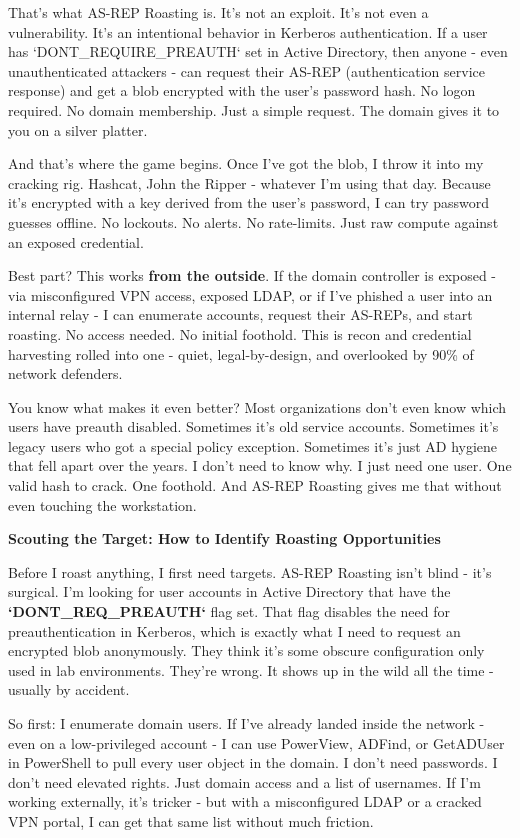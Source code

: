 That’s what AS-REP Roasting is. It’s not an exploit. It’s not even a vulnerability. It’s an intentional behavior in Kerberos authentication. If a user has `DONT\_REQUIRE\_PREAUTH` set in Active Directory, then anyone - even unauthenticated attackers - can request their AS-REP (authentication service response) and get a blob encrypted with the user’s password hash. No logon required. No domain membership. Just a simple request. The domain gives it to you on a silver platter.

And that’s where the game begins. Once I’ve got the blob, I throw it into my cracking rig. Hashcat, John the Ripper - whatever I’m using that day. Because it’s encrypted with a key derived from the user’s password, I can try password guesses offline. No lockouts. No alerts. No rate-limits. Just raw compute against an exposed credential. 

Best part? This works \textbf{from the outside}. If the domain controller is exposed - via misconfigured VPN access, exposed LDAP, or if I’ve phished a user into an internal relay - I can enumerate accounts, request their AS-REPs, and start roasting. No access needed. No initial foothold. This is recon and credential harvesting rolled into one - quiet, legal-by-design, and overlooked by 90\% of network defenders.

You know what makes it even better? Most organizations don’t even know which users have preauth disabled. Sometimes it’s old service accounts. Sometimes it’s legacy users who got a special policy exception. Sometimes it’s just AD hygiene that fell apart over the years. I don’t need to know why. I just need one user. One valid hash to crack. One foothold. And AS-REP Roasting gives me that without even touching the workstation.

\textbf{Scouting the Target: How to Identify Roasting Opportunities}

Before I roast anything, I first need targets. AS-REP Roasting isn’t blind - it’s surgical. I’m looking for user accounts in Active Directory that have the \textbf{`DONT\_REQ\_PREAUTH`} flag set. That flag disables the need for preauthentication in Kerberos, which is exactly what I need to request an encrypted blob anonymously. They think it’s some obscure configuration only used in lab environments. They’re wrong. It shows up in the wild all the time - usually by accident.

So first: I enumerate domain users. If I’ve already landed inside the network - even on a low-privileged account - I can use PowerView, ADFind, or GetADUser in PowerShell to pull every user object in the domain. I don’t need passwords. I don’t need elevated rights. Just domain access and a list of usernames. If I’m working externally, it’s tricker - but with a misconfigured LDAP or a cracked VPN portal, I can get that same list without much friction.

